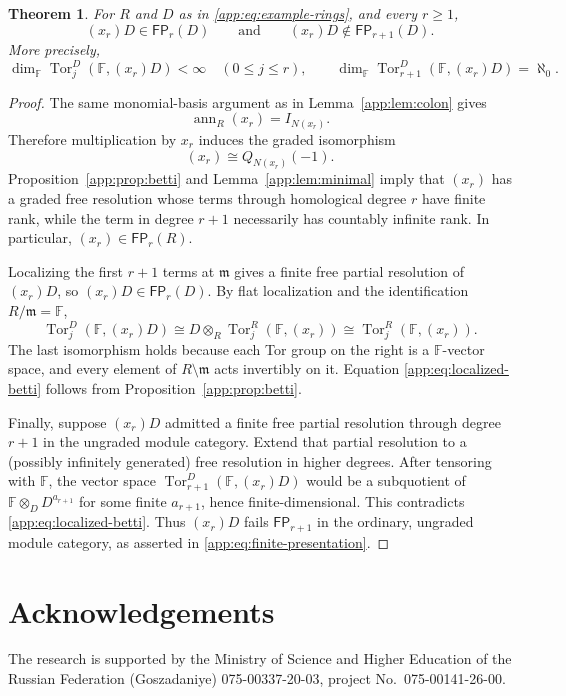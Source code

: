 \documentclass[11pt]{article}
\numberwithin{equation}{section}
\newtheorem{theorem}{Theorem}[section]
\theoremstyle{definition}
\theoremstyle{remark}
\newcommand{\Tor}{\operatorname{Tor}}
\newcommand{\FP}{\mathsf{FP}}
\begin{document}
\begin{theorem}\label{app:thm:FP}
For $R$ and $D$ as in \eqref{app:eq:example-rings}, and every $r\ge1$,
\[
(x_r)D\in\FP_r(D)
\qquad\text{and}\qquad
(x_r)D\notin\FP_{r+1}(D).
\tag{11}\label{app:eq:finite-presentation}
\]
More precisely,
\[
\dim_\mathbb F\Tor_j^D(\mathbb F,(x_r)D)<\infty\quad(0\le j\le r),
\qquad
\dim_\mathbb F\Tor_{r+1}^D(\mathbb F,(x_r)D)=\aleph_0.
\tag{12}\label{app:eq:localized-betti}
\]
\end{theorem}
\begin{proof}
The same monomial-basis argument as in Lemma~\ref{app:lem:colon} gives
\[
\operatorname{ann}_R(x_r)=I_{N(x_r)}.
\]
Therefore multiplication by $x_r$ induces the graded isomorphism
\[
(x_r)\cong Q_{N(x_r)}(-1).
\tag{13}\label{app:eq:principal-ideal}
\]
Proposition~\ref{app:prop:betti} and Lemma~\ref{app:lem:minimal} imply that $(x_r)$ has a graded free resolution whose terms through homological degree $r$ have finite rank, while the term in degree $r+1$ necessarily has countably infinite rank.  In particular, $(x_r)\in\FP_r(R)$.

Localizing the first $r+1$ terms at $\mathfrak m$ gives a finite free partial resolution of $(x_r)D$, so $(x_r)D\in\FP_r(D)$.  By flat localization and the identification $R/\mathfrak m=\mathbb F$,
\[
\Tor_j^D(\mathbb F,(x_r)D)
\cong D\otimes_R\Tor_j^R(\mathbb F,(x_r))
\cong\Tor_j^R(\mathbb F,(x_r)).
\tag{14}\label{app:eq:localized-tor}
\]
The last isomorphism holds because each Tor group on the right is a $\mathbb F$-vector space, and every element of $R\setminus\mathfrak m$ acts invertibly on it.  Equation \eqref{app:eq:localized-betti} follows from Proposition~\ref{app:prop:betti}.

Finally, suppose $(x_r)D$ admitted a finite free partial resolution
through degree $r+1$ in the ungraded module category.  Extend that partial resolution to a (possibly infinitely generated) free resolution in higher degrees.  After tensoring with $\mathbb F$, the vector space $\Tor_{r+1}^D(\mathbb F,(x_r)D)$ would be a subquotient of $\mathbb F\otimes_D D^{a_{r+1}}$ for some finite $a_{r+1}$, hence finite-dimensional.  This contradicts \eqref{app:eq:localized-betti}.  Thus $(x_r)D$ fails $\FP_{r+1}$ in the ordinary, ungraded module
category, as asserted in \eqref{app:eq:finite-presentation}.
\end{proof}


\section*{Acknowledgements}
The research is supported by the Ministry of Science and Higher Education
of the Russian Federation (Goszadaniye) 075-00337-20-03, project
No.~075-00141-26-00.
\end{document}
